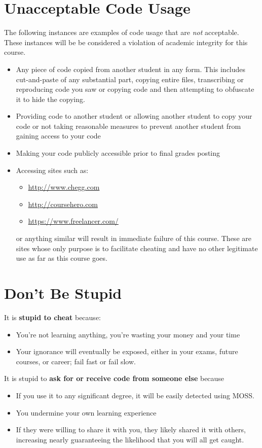 \documentclass[12pt]{scrartcl}
\begin{document}
\section*{Unacceptable Code Usage}

The following instances are examples of code usage that are \emph{not}
acceptable.  These instances will be be considered a violation of academic 
integrity for this course.

\begin{itemize}
  \item Any piece of code copied from another student in any form.  This
  includes cut-and-paste of any substantial part, copying entire files, 
  transcribing or reproducing code you saw or copying code and then attempting
  to obfuscate it to hide the copying.
  \item Providing code to another student or allowing another student to copy your code or not taking reasonable measures to prevent another student from gaining access to your code
  \item Making your code publicly accessible prior to final grades posting
  \item Accessing sites such as:
  \begin{itemize}
    \item \url{http://www.chegg.com}
    \item \url{http://coursehero.com}
    \item \url{https://www.freelancer.com/} 
  \end{itemize}
  or anything similar will result in immediate failure of this course.  These
  are sites whose only purpose is to facilitate cheating and have no other 
  legitimate use as far as this course goes.
\end{itemize}

\section*{Don't Be Stupid}

It is \textbf{stupid to cheat} because:
\begin{itemize}
  \item You're not learning anything, you're wasting your money and your time 
  \item Your ignorance will eventually be exposed, either in your exams, future courses, or career; fail fast or fail slow.
\end{itemize}

It is stupid to \textbf{ask for or receive code from someone else} because
\begin{itemize}
  \item If you use it to any significant degree, it will be easily detected using MOSS.
  \item You undermine your own learning experience
  \item If they were willing to share it with you, they likely shared it with others, increasing nearly guaranteeing the likelihood that you will all get caught.
\end{itemize}
\end{document}
